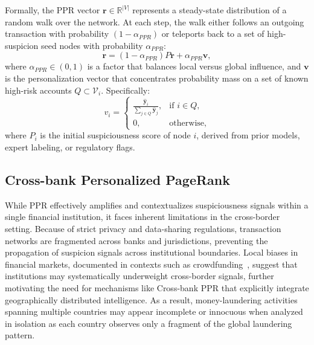 Formally, the PPR vector $\boldsymbol{r} \in \mathbb{R}^{|V|}$ represents a steady-state distribution of a random walk over the network. At each step, the walk either follows an outgoing transaction with probability $(1-\alpha_{PPR})$ or teleports back to a set of high-suspicion seed nodes with probability $\alpha_{PPR}$:
\begin{equation}
    \boldsymbol{r} = (1 - \alpha_{PPR})P \boldsymbol{r} + \alpha_{PPR} \boldsymbol{v},
\label{eq:ppr}
\end{equation}
where $\alpha_{PPR} \in (0,1)$ is a factor that balances local versus global influence, and $\boldsymbol{v}$ is the personalization vector that concentrates probability mass on a set of known high-risk accounts $Q \subset \mathcal{V}_i$. Specifically:
\begin{equation}
v_i = 
\begin{cases}
    \frac{\hat{\mathbf{y}}_i}{\sum_{j \in Q} \hat{\mathbf{y}}_j}, & \text{if } i \in Q, \\
    0, & \text{otherwise,}
\end{cases}
\end{equation}
where $P_i$ is the initial suspiciousness score of node $i$, derived from prior models, expert labeling, or regulatory flags. 


\subsection{Cross-bank Personalized PageRank}
While PPR effectively amplifies and contextualizes suspiciousness signals within a single financial institution, it faces inherent limitations in the cross-border setting. Because of strict privacy and data-sharing regulations, transaction networks are fragmented across banks and jurisdictions, preventing the propagation of suspicion signals across institutional boundaries. Local biases in financial markets, documented in contexts such as crowdfunding~\parencite{ni2025xinyang}, suggest that institutions may systematically underweight cross-border signals, further motivating the need for mechanisms like Cross-bank PPR that explicitly integrate geographically distributed intelligence. As a result, money-laundering activities spanning multiple countries may appear incomplete or innocuous when analyzed in isolation as each country observes only a fragment of the global laundering pattern.  

